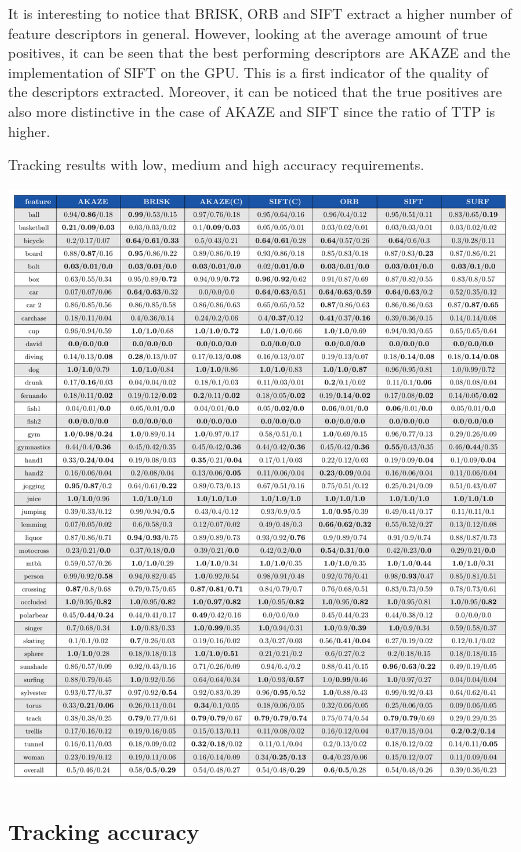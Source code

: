 It is interesting to notice that BRISK, ORB and SIFT extract a higher number of feature descriptors in general. However, looking at the average amount of true positives, it can be seen that the best performing descriptors are AKAZE and the implementation of SIFT on the GPU. This is a first indicator of the quality of the descriptors extracted. Moreover, it can be noticed that the true positives are also more distinctive in the case of AKAZE and SIFT since the ratio of TTP is higher.

\begin{table}[t]
\caption{Tracking results with low, medium and high accuracy requirements.} 
\centerline{%
		\includegraphics[width=\linewidth]{tables/tracking_precision.pdf}}
		\vspace{8mm}
	\label{table:taccuracy}
\end{table}


\subsection{Tracking accuracy}

